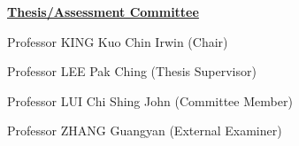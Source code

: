 {

\centering
{
	\vspace*{2cm}
    
    \huge \textbf{\underline{Thesis/Assessment Committee}}}

	\vspace*{1cm}

\noindent Professor KING Kuo Chin Irwin (Chair)

\noindent Professor LEE Pak Ching (Thesis Supervisor)

\noindent Professor LUI Chi Shing John (Committee Member)

\noindent Professor ZHANG Guangyan (External Examiner)

}
